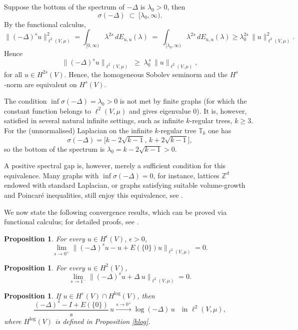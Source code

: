\documentclass[reqno,12pt]{amsart}
\numberwithin{equation}{section}
\newtheorem{proposition}[theorem]{Proposition}
\begin{document}
Suppose the bottom of the spectrum of $-\Delta$ is \(\lambda_{0}>0\), then
\[
\sigma(-\Delta)\;\subset\;[\lambda_{0},\infty).
\]
By the functional calculus,
\[
\|(-\Delta)^{s}u\|_{\ell^{2}\left(V,\mu\right)}^{2}
=\int_{[0,\infty)}\lambda^{2s}\,dE_{u,u}(\lambda)
\;=\;
\int_{[\lambda_0,\infty)}\lambda^{2s}\,dE_{u,u}(\lambda)
\ge \lambda_{0}^{2s}\,\|u\|_{\ell^{2}\left(V,\mu\right)}^{2}.
\]
Hence
\[
\|(-\Delta)^{s}u\|_{\ell^{2}\left(V,\mu\right)}
\;\ge\;
\lambda_{0}^{\,s}\,\|u\|_{\ell^{2}\left(V,\mu\right)},
\]
for all $u\in H^{2s}\left(V\right)$. Hence, the homogeneous Sobolev seminorm and the \(H^{s}\)‐norm are equivalent on \(H^{s}\left(V\right)\).

The condition \(\inf\sigma(-\Delta)=\lambda_{0}>0\) is not met by finite graphs (for which the constant function belongs to \(\ell^{2}(V,\mu)\) and gives eigenvalue \(0\)).  It is, however, satisfied in several natural infinite settings, such as infinite \(k\)-regular trees, \(k\ge3\).  For the (unnormalised) Laplacian on the infinite \(k\)-regular tree \(\mathbb T_k\) one has 
	\[
	\sigma(-\Delta)=\bigl[k-2\sqrt{k-1},\,k+2\sqrt{k-1}\bigr],
	\]
	so the bottom of the spectrum is
	\(\lambda_{0}=k-2\sqrt{k-1}>0\).

	
	A positive spectral gap is, however, merely a sufficient condition for this equivalence.
	Many graphs with \(\inf\sigma(-\Delta)=0\), for instance, lattices \(\mathbb Z^{d}\)
	endowed with standard Laplacian, or graphs satisfying suitable volume-growth
	and Poincaré inequalities, still enjoy this  equivalence, see \cite[Lemma 2.1]{wang2024fractional}.

We now state the following convergence results, which can be proved via functional calculus; for detailed proofs, see \cite{chen2025logarithmic}.

\begin{proposition}\label{slx1}
	For every \(u\in H^{\epsilon}(V)\), \(\epsilon>0\), 
	\[
	\lim_{s\to0^{+}}\bigl\|(-\Delta)^{s}u - u+E(\{0\})u\bigr\|_{\ell^{2}(V,\mu)} = 0.
	\]
\end{proposition}

\begin{proposition}\label{slx2}
	For every \(u\in H^2(V)\), 
	\[
	\lim_{s\to1^{-}}\bigl\|(-\Delta)^{s}u + \Delta \: u\bigr\|_{\ell^{2}(V,\mu)} = 0.
	\]
\end{proposition}

\begin{proposition}\label{slx3}
	If \(u\in H^\varepsilon(V)\cap H^{\log}(V)\), then
	\[
	\frac{(-\Delta)^s - I + E(\{0\})}{s}\,u
	\xrightarrow{s\to0^+}
	\log(-\Delta)\,u
	\quad\text{in }\ell^2(V,\mu),
	\]
	where $H^{\log}(V)$ is defined in Proposition \ref{hlog}.
\end{proposition}
\end{document}
